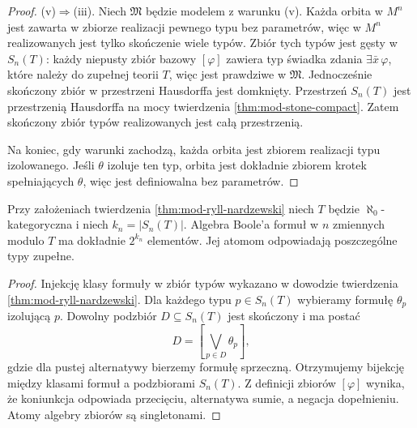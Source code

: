 \begin{proof}
(v)$\Rightarrow$(iii).
Niech $\mathfrak M$ będzie modelem z warunku (v).
Każda orbita w $M^n$ jest zawarta w zbiorze
realizacji pewnego typu bez parametrów,
więc w $M^n$ realizowanych jest tylko
skończenie wiele typów. Zbiór tych typów
jest gęsty w $S_n(T)$: każdy niepusty
zbiór bazowy $[\varphi]$ zawiera typ
świadka zdania $\exists\bar x\,\varphi$,
które należy do zupełnej teorii $T$,
więc jest prawdziwe w $\mathfrak M$.
Jednocześnie skończony zbiór w przestrzeni
Hausdorffa jest domknięty. Przestrzeń $S_n(T)$
jest przestrzenią Hausdorffa na mocy twierdzenia
\ref{thm:mod-stone-compact}. Zatem skończony zbiór
typów realizowanych jest całą przestrzenią.

Na koniec, gdy warunki zachodzą, każda orbita
jest zbiorem realizacji typu izolowanego.
Jeśli $\theta$ izoluje ten typ, orbita
jest dokładnie zbiorem krotek spełniających
$\theta$, więc jest definiowalna bez parametrów.
\end{proof}

\begin{wniosek}
\label{cor:mod-rn-boolean-cardinality}
Przy założeniach twierdzenia
\ref{thm:mod-ryll-nardzewski} niech $T$
będzie $\aleph_0$-kategoryczna i niech
$k_n=|S_n(T)|$. Algebra Boole'a formuł
w $n$ zmiennych modulo $T$ ma dokładnie
$2^{k_n}$ elementów. Jej atomom odpowiadają
poszczególne typy zupełne.
\end{wniosek}
\begin{proof}
Injekcję klasy formuły w zbiór typów wykazano
w dowodzie twierdzenia \ref{thm:mod-ryll-nardzewski}.
Dla każdego typu $p\in S_n(T)$ wybieramy
formułę $\theta_p$ izolującą $p$.
Dowolny podzbiór $D\subseteq S_n(T)$
jest skończony i ma postać
\[
D=\left[\bigvee_{p\in D}\theta_p\right],
\]
gdzie dla pustej alternatywy bierzemy
formułę sprzeczną. Otrzymujemy bijekcję
między klasami formuł a podzbiorami $S_n(T)$.
Z definicji zbiorów $[\varphi]$ wynika,
że koniunkcja odpowiada przecięciu,
alternatywa sumie, a negacja dopełnieniu.
Atomy algebry zbiorów są singletonami.
\end{proof}

